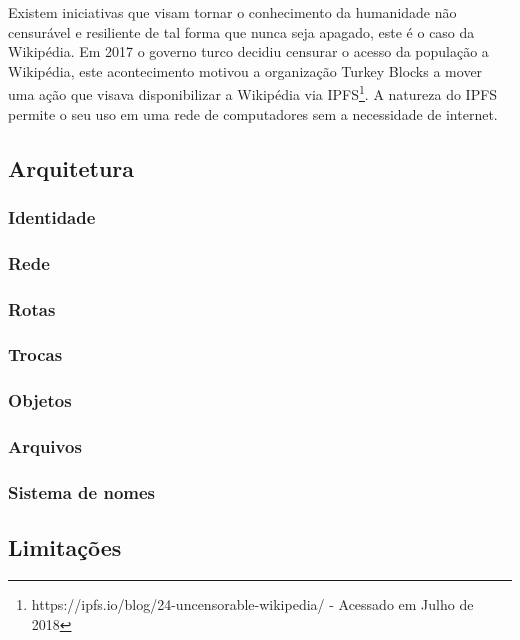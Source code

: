 \documentclass[tcc,capa]{texufpel}
\begin{document}
    Existem iniciativas que visam tornar o conhecimento da humanidade não censurável e resiliente de tal forma que nunca seja apagado, este é o caso da Wikipédia. Em 2017 o governo turco decidiu censurar o acesso da população a Wikipédia, este acontecimento motivou a organização Turkey Blocks a mover uma ação que visava disponibilizar a Wikipédia via IPFS\footnote{https://ipfs.io/blog/24-uncensorable-wikipedia/ - Acessado em Julho de 2018}. A natureza do IPFS permite o seu uso em uma rede de computadores sem a necessidade de internet.

	\subsection{Arquitetura}
    
    	\subsubsection{Identidade}
        
        \subsubsection{Rede}
        
        \subsubsection{Rotas}
        
        \subsubsection{Trocas}
        
        \subsubsection{Objetos}
        
        \subsubsection{Arquivos}
        
        \subsubsection{Sistema de nomes}
    
    \subsection{Limitações}
    
\end{document}
